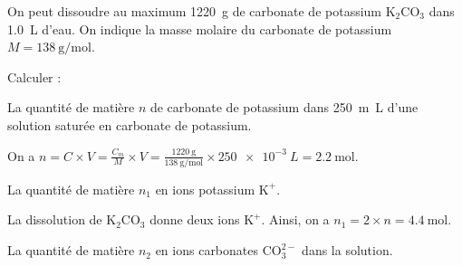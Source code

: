 \debutEntrainement

On peut dissoudre au maximum \SI{1220}{\gram} de carbonate de potassium $\textrm{K}_2\textrm{C}\textrm{O}_3$ dans \SI{1,0}{\liter} d'eau. On indique la masse molaire du carbonate de potassium $M=\SI{138}{\gram\per\mol}$. 

Calculer : 


\begin{enonce}
La quantité de matière $n$ de carbonate de potassium dans \SI{250}{m\liter} d'une solution saturée en carbonate de potassium.
\end{enonce}


\begin{corrige}
On a $n=C\times V=\frac{C_m}{M}\times V=\frac{\SI{1220}{\gram}}{\SI{138}{\gram\per\mol}}\times\SI{250e-3}{L}=\SI{2,2}{\mol}$.
\end{corrige}


\begin{enonce}
La quantité de matière $n_1$ en ions potassium $\textrm{K}^+$.
\end{enonce}


\begin{corrige}
La dissolution de $\textrm{K}_2\textrm{C}\textrm{O}_3$ donne deux ions $\textrm{K}^+$. Ainsi, on a $n_1=2\times n=\SI{4,4}{\mol}$.
\end{corrige}



\begin{enonce}
La quantité de matière $n_2$ en ions carbonates $\textrm{C}\textrm{O}_3^{2-}$ dans la solution.
\end{enonce}


